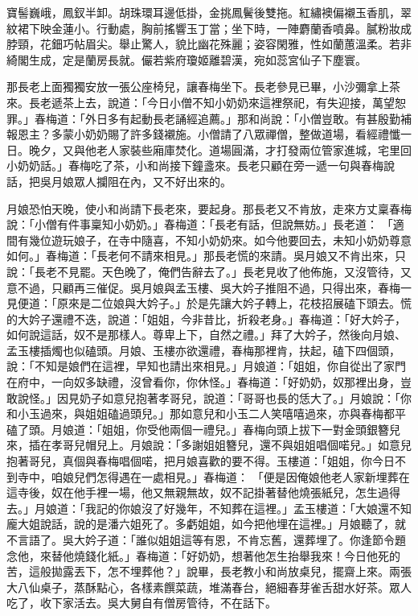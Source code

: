 寶髻巍峨，鳳釵半卸。胡珠環耳邊低掛，金挑鳳鬢後雙拖。紅繡襖偏襯玉香肌，翠紋裙下映金蓮小。行動處，胸前搖響玉丁當；坐下時，一陣麝蘭香噴鼻。膩粉妝成脖頸，花鈿巧帖眉尖。舉止驚人，貌比幽花殊麗；姿容閑雅，性如蘭蕙溫柔。若非綺閣生成，定是蘭房長就。儼若紫府瓊姬離碧漢，宛如蕊宮仙子下塵寰。

那長老上面獨獨安放一張公座椅兒，讓春梅坐下。長老參見已畢，小沙彌拿上茶來。長老遞茶上去，說道：「今日小僧不知小奶奶來這裡祭祀，有失迎接，萬望恕罪。」春梅道：「外日多有起動長老誦經追薦。」那和尚說：「小僧豈敢。有甚殷勤補報恩主？多蒙小奶奶賜了許多錢襯施。小僧請了八眾禪僧，整做道場，看經禮懺一日。晚夕，又與他老人家裝些廂庫焚化。道場圓滿，才打發兩位管家進城，宅里回小奶奶話。」春梅吃了茶，小和尚接下鐘盞來。長老只顧在旁一遞一句與春梅說話，把吳月娘眾人攔阻在內，又不好出來的。

月娘恐怕天晚，使小和尚請下長老來，要起身。那長老又不肯放，走來方丈稟春梅說：「小僧有件事稟知小奶奶。」春梅道：「長老有話，但說無妨。」長老道： 「適間有幾位遊玩娘子，在寺中隨喜，不知小奶奶來。如今他要回去，未知小奶奶尊意如何。」春梅道：「長老何不請來相見。」那長老慌的來請。吳月娘又不肯出來，只說：「長老不見罷。天色晚了，俺們告辭去了。」長老見收了他佈施，又沒管待，又意不過，只顧再三催促。吳月娘與孟玉樓、吳大妗子推阻不過，只得出來，春梅一見便道：「原來是二位娘與大妗子。」於是先讓大妗子轉上，花枝招展磕下頭去。慌的大妗子還禮不迭，說道：「姐姐，今非昔比，折殺老身。」春梅道：「好大妗子，如何說這話，奴不是那樣人。尊卑上下，自然之禮。」拜了大妗子，然後向月娘、孟玉樓插燭也似磕頭。月娘、玉樓亦欲還禮，春梅那裡肯，扶起，磕下四個頭，說：「不知是娘們在這裡，早知也請出來相見。」月娘道：「姐姐，你自從出了家門在府中，一向奴多缺禮，沒曾看你，你休怪。」春梅道：「好奶奶，奴那裡出身，豈敢說怪。」因見奶子如意兒抱著孝哥兒，說道：「哥哥也長的恁大了。」月娘說：「你和小玉過來，與姐姐磕過頭兒。」那如意兒和小玉二人笑嘻嘻過來，亦與春梅都平磕了頭。月娘道：「姐姐，你受他兩個一禮兒。」春梅向頭上拔下一對金頭銀簪兒來，插在孝哥兒帽兒上。月娘說：「多謝姐姐簪兒，還不與姐姐唱個喏兒。」如意兒抱著哥兒，真個與春梅唱個喏，把月娘喜歡的要不得。玉樓道：「姐姐，你今日不到寺中，咱娘兒們怎得遇在一處相見。」春梅道： 「便是因俺娘他老人家新埋葬在這寺後，奴在他手裡一場，他又無親無故，奴不記掛著替他燒張紙兒，怎生過得去。」月娘道：「我記的你娘沒了好幾年，不知葬在這裡。」孟玉樓道：「大娘還不知龐大姐說話，說的是潘六姐死了。多虧姐姐，如今把他埋在這裡。」月娘聽了，就不言語了。吳大妗子道：「誰似姐姐這等有恩，不肯忘舊，還葬埋了。你逢節令題念他，來替他燒錢化紙。」春梅道：「好奶奶，想著他怎生抬舉我來！今日他死的苦，這般拋露丟下，怎不埋葬他？」說畢，長老教小和尚放桌兒，擺齋上來。兩張大八仙桌子，蒸酥點心，各樣素饌菜蔬，堆滿春台，絕細春芽雀舌甜水好茶。眾人吃了，收下家活去。吳大舅自有僧房管待，不在話下。

